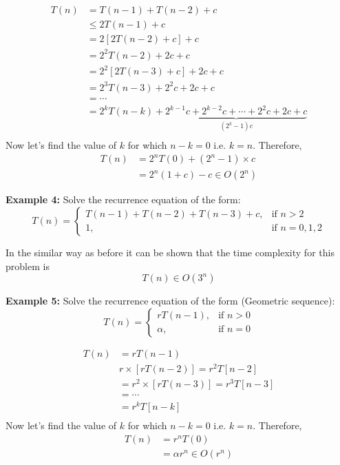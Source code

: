 \documentclass[a4paper,11pt]{book}
\begin{document}
\begin{align*}
	T(n) &= T(n-1) + T(n-2) + c \\
	     &\leq 2T(n-1) + c \\
	     &= 2\left[2T(n-2) + c\right] + c\\
	     &= 2^2T(n-2) + 2c + c\\
	     &= 2^2\left[2T(n-3) + c\right] + 2c + c\\
	     &= 2^3 T(n-3) + 2^2c + 2c + c\\
	     &= \cdots\\
	     &= 2^k T(n-k) + \underbrace{2^{k-1}c + 2^{k-2}c + \cdots + 2^2c + 2c + c}_{(2^k-1)c}\\
\end{align*}
Now let's find the value of $k$ for which $n-k = 0$ i.e. $k=n$. Therefore,
\begin{align*}
	T(n) &= 2^n T(0) + (2^n-1)\times c\\
	     &= 2^n (1+c) - c \in O(2^n)
\end{align*}

\noindent \textbf{Example 4:} Solve the recurrence equation of the form:
\[
   T(n) = 
\begin{cases}
    T(n-1) + T(n-2) + T(n-3) + c, & \text{if } n > 2\\
    1,                   & \text{if } n = 0, 1, 2
\end{cases}
\]

\noindent In the similar way as before it can be shown that the time complexity for this problem is
$$T(n) \in O(3^n)$$

\noindent \textbf{Example 5:} Solve the recurrence equation of the form (Geometric sequence):
\[
   T(n) = 
\begin{cases}
    rT(n-1) , & \text{if } n > 0\\
    \alpha,                   & \text{if } n = 0
\end{cases}
\]

\begin{align*}
	T(n) &= rT(n-1) \\
	     & r \times \left[rT(n-2)\right] = r^2 T[n-2] \\
	     &= r^2 \times \left[rT(n-3)\right] = r^3 T[n-3]\\
	     &= \cdots\\
	     &= r^k T[n-k]\\
\end{align*}
\noindent Now let's find the value of $k$ for which $n-k = 0$ i.e. $k=n$. Therefore,
\begin{align*}
	T(n) &= r^n T(0)\\
	     &= \alpha r^n \in O(r^n)
\end{align*}
\end{document}
